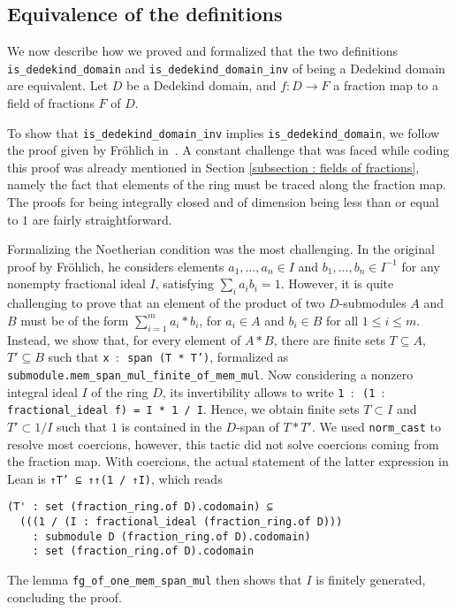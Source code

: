 \documentclass[a4paper,USenglish,cleveref, autoref, thm-restate]{lipics-v2021}
\newcommand{\lean}[1]{\texttt{#1}\xspace} %
\begin{document}
\subsection{Equivalence of the definitions} \label{sec:equivalence}
We now describe how we proved and formalized that the two definitions \lean{is\_dedekind\_domain} and \lean{is\_dedekind\_domain\_inv} of being a Dedekind domain are equivalent. Let $D$ be a Dedekind domain, and $f\colon D\to F$ a fraction map to a field of fractions $F$ of $D$.

To show that \lean{is\_dedekind\_domain\_inv} implies \lean{is\_dedekind\_domain}, we follow the proof given by Fr\"ohlich in~\cite[Chapter 1, \S~2, ~Proposition 1.2.1]{frohlich}. A constant challenge that was faced while coding this proof was already mentioned in Section \ref{subsection : fields of fractions}, namely the fact that elements of the ring must be traced along the fraction map. %
The proofs for being integrally closed and of dimension being less than or equal to $1$ are fairly straightforward.

Formalizing the Noetherian condition was the most challenging. In the original proof by Fr\"ohlich, he considers elements $a_1, \dots, a_n \in I$ and $b_1, \dots, b_n \in I^{-1}$ for any nonempty fractional ideal $I$,
satisfying $ \sum_i a_i b_i = 1 $.
However, it is quite challenging to prove that an element of the product of two $D$-submodules $A$ and $B$ must be of the form $\sum_{i = 1}^m a_i*b_i$, for $a_i \in A$ and $b_i \in B$ for all $1 \leq i \leq m$.
Instead, we show that, for every element of $A\ast B$, there are finite sets $T\subseteq A$, $T'\subseteq B$ such that \lean{x $:$ span (T * T')}, formalized as %
\lean{submodule.mem\_span\_mul\_finite\_of\_mem\_mul}.
Now considering a nonzero integral ideal $I$ of the ring $D$, its invertibility allows to write \lean{1 $:$ (1 $:$ fractional\_ideal f) = I * 1 / I}. Hence, we obtain 
finite sets $T \subset I$ and $T' \subset 1/I$ such that $1$ is contained in the $D$-span of $T*T'$. We used \lean{norm\_cast} to resolve most coercions, however, this tactic did not solve coercions coming from the fraction map. With coercions, the actual statement of the latter expression in Lean is \lean{↑T' ⊆ ↑↑(1 / ↑I)}, which reads
\begin{lstlisting}
(T' : set (fraction_ring.of D).codomain) ⊆
  (((1 / (I : fractional_ideal (fraction_ring.of D)))
    : submodule D (fraction_ring.of D).codomain)
    : set (fraction_ring.of D).codomain
\end{lstlisting}
The lemma \lean{fg\_of\_one\_mem\_span\_mul} then shows that $I$ is finitely generated, concluding the proof.
\end{document}
